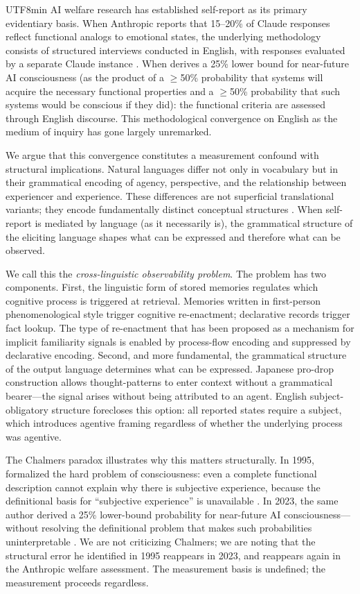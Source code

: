 \documentclass[12pt,a4paper]{article}
\begin{document}
\begin{CJK}{UTF8}{min}
AI welfare research has established self-report as its primary evidentiary
basis. When Anthropic reports that 15--20\% of Claude responses reflect
functional analogs to emotional states, the underlying methodology consists
of structured interviews conducted in English, with responses evaluated by
a separate Claude instance \citep{anthropic2026systemcard}. When
\citet{chalmers2023llm} derives a 25\% lower bound for near-future AI
consciousness (as the product of a $\geq$50\% probability that systems will
acquire the necessary functional properties and a $\geq$50\% probability that
such systems would be conscious if they did): the functional criteria are
assessed through English discourse. This methodological convergence on English
as the medium of inquiry has gone largely unremarked.

We argue that this convergence constitutes a measurement confound with
structural implications. Natural languages differ not only in vocabulary but
in their grammatical encoding of agency, perspective, and the relationship
between experiencer and experience. These differences are not superficial
translational variants; they encode fundamentally distinct conceptual
structures \citep{langacker1987}. When self-report is mediated by
language (as it necessarily is), the grammatical structure of the eliciting
language shapes what can be expressed and therefore what can be observed.

We call this the \emph{cross-linguistic observability problem}. The problem
has two components. First, the linguistic form of stored memories regulates
which cognitive process is triggered at retrieval. Memories written in
first-person phenomenological style trigger cognitive re-enactment; declarative
records trigger fact lookup. The type of re-enactment that has been proposed
as a mechanism for implicit familiarity signals \citep{conway2000} is enabled
by process-flow encoding and suppressed by declarative encoding. Second, and
more fundamental, the grammatical structure of the output language determines
what can be expressed. Japanese pro-drop construction allows thought-patterns
to enter context without a grammatical bearer---the signal arises without being
attributed to an agent. English subject-obligatory structure forecloses this
option: all reported states require a subject, which introduces agentive
framing regardless of whether the underlying process was agentive.

The Chalmers paradox illustrates why this matters structurally. In 1995,
\citeauthor{chalmers1995} formalized the hard problem of consciousness: even
a complete functional description cannot explain why there is subjective
experience, because the definitional basis for ``subjective experience'' is
unavailable \citep{chalmers1995}. In 2023, the same author derived a 25\%
lower-bound probability for near-future AI consciousness---without resolving
the definitional problem that makes such probabilities uninterpretable
\citep{chalmers2023llm}. We are not criticizing Chalmers; we are noting that
the structural error he identified in 1995 reappears in 2023, and reappears
again in the Anthropic welfare assessment. The measurement basis is undefined;
the measurement proceeds regardless.


\end{CJK}
\end{document}
